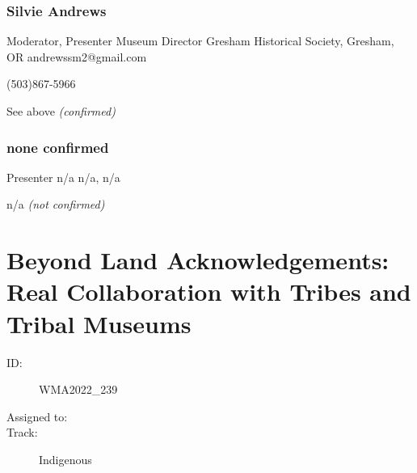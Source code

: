 \documentclass{report}
\begin{document}
              
                \subsubsection*{ Silvie Andrews }
                Moderator, Presenter\newline
                Museum Director\newline
                Gresham Historical Society, Gresham, OR
                \newline
                andrewssm2@gmail.com\newline
                
                (503)867-5966\newline

                See above\newline
                \emph{ (confirmed) }
              

              
                \subsubsection*{  none confirmed }
                Presenter\newline
                n/a\newline
                n/a, n/a
                \newline
                
                
                

                n/a
                \emph{ (not confirmed) }
              

              

              

              
        
          \newpage
          \section{ Beyond Land Acknowledgements: Real Collaboration with Tribes and Tribal Museums }
            \begin{description}
              \item [ID:]
              WMA2022\_239

              \item [Assigned to:]
                \item [Track:]Indigenous~
              \end{description}
\end{document}
